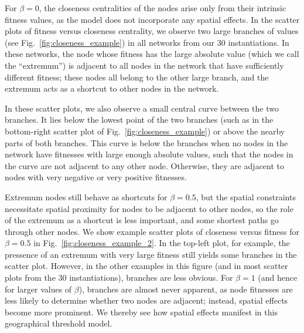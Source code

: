 \documentclass[%
 reprint,
 amsmath,amssymb,
 aps,
]{revtex4-1}
\begin{document}
For $\beta = 0$, the closeness centralities of the nodes arise only from their intrinsic fitness values, as the model does not incorporate any spatial effects.
In the scatter plots of fitness versus closeness centrality, we observe two large branches of values (see Fig.~\ref{fig:closeness_example}) in all networks from our $30$ instantiations. In these networks, the node whose fitness has the large absolute value (which we call the ``extremum'') is adjacent to all nodes in the network that have sufficiently different fitness; these nodes all belong to the other large branch, and the extremum acts as a shortcut to other nodes in the network.

In these scatter plots, we also observe a small central curve between the two branches. It lies below the lowest point of the two branches (such as in the bottom-right scatter plot of Fig.~\ref{fig:closeness_example}) or above the nearby parts of both branches. This curve is below the branches when no nodes in the network have fitnesses with large enough absolute values, such that the nodes in the curve are not adjacent to any other node.
Otherwise, they are adjacent to nodes with 
very negative or very positive fitnesses. 

Extremum nodes still behave as shortcuts for $\beta = 0.5$, but the spatial constraints necessitate spatial proximity for nodes to be adjacent to other nodes, so the role of the extremum as a shortcut is less important, and some shortest paths go through other nodes. 
We show example scatter plots of closeness versus fitness for $\beta = 0.5$ in Fig.~\ref{fig:closeness_example_2}. In the top-left plot, for example, {\color{red}the pressence of an extremum with very large fitness} still yields some branches in the scatter plot. However, in the other examples in this figure (and in most scatter plots from the $30$ instantiations), branches are less obvious. For $\beta = 1$ (and hence for larger values of $\beta$), branches are almost never apparent, as node fitnesses are less likely to determine whether two nodes are adjacent; instead, spatial effects become more prominent. We thereby see how spatial effects manifest in this geographical threshold model.
 
\end{document}
